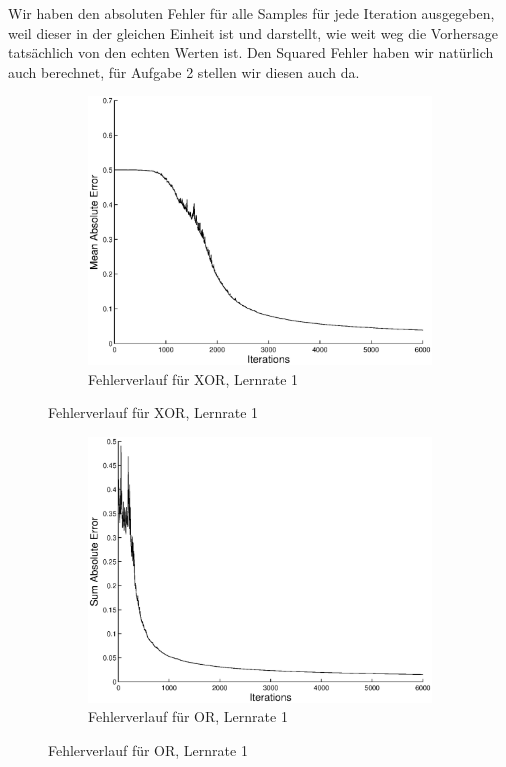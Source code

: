 \documentclass{article}
\begin{document}
Wir haben den absoluten Fehler für alle Samples für jede Iteration ausgegeben, weil dieser in der gleichen Einheit ist und darstellt, wie weit weg die Vorhersage tatsächlich von den echten Werten ist. Den Squared Fehler haben wir natürlich auch berechnet, für Aufgabe 2 stellen wir diesen auch da.\\

	\begin{figure}[H]
	  \begin{subfigure}
	    \centering
	    \includegraphics[scale=0.75]{task1-xor-error-6k.eps}
      \caption{Fehlerverlauf für XOR, Lernrate 1}
	  \end{subfigure}
	\end{figure}
	\begin{figure}[H]
	  \begin{subfigure}
	    \centering
	    \includegraphics[scale=0.75]{task1-or-error-6k.eps}
      \caption{Fehlerverlauf für OR, Lernrate 1}
	  \end{subfigure}
	\end{figure}
\end{document}
